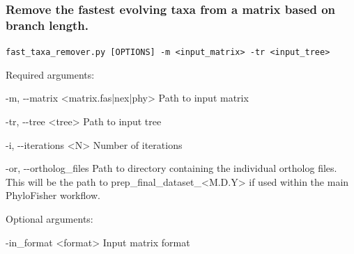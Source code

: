 \documentclass{article}
\def\code#1{\texttt{#1}}
\begin{document}
        \vspace{0.5cm}
        
        \subsubsection{Remove the fastest evolving taxa from a matrix based on branch length.}
        \begin{description}
        
            \vspace{0.2cm}
            \item \code{fast\_taxa\_remover.py [OPTIONS] -m <input\_matrix> -tr <input\_tree>}
            \vspace{0.2cm}
            
            \begin{description}
                \item Required arguments:
                \begin{description}
                    \item -m, -\/-matrix \hspace{0.2cm} <matrix.fas|nex|phy> \hspace{0.2cm} Path to input matrix
                    \item -tr, -\/-tree \hspace{0.2cm} <tree> \hspace{0.2cm} Path to input tree
                    \item -i, -\/-iterations \hspace{0.2cm} <N> \hspace{0.2cm} Number of iterations
                    \item -or, -\/-ortholog\_files  \hspace{0.2cm} Path to directory containing the individual ortholog files. This will be the path to prep\_final\_dataset\_<M.D.Y> if used within the main PhyloFisher workflow.
                \end{description}
            \end{description}
            \vspace{0.2cm}
            \begin{description}
                \item Optional arguments:
                \begin{description}
                    \item -in\_format \hspace{0.2cm} <format> \hspace{0.2cm} Input matrix format

\end{description}
\end{description}
\end{description}
\end{document}

